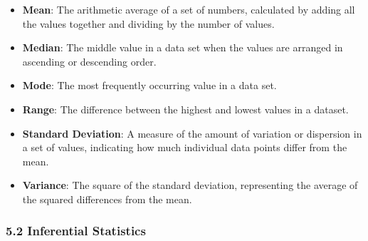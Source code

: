 \documentclass[
]{book}
\providecommand{\tightlist}{%
  \setlength{\itemsep}{0pt}\setlength{\parskip}{0pt}}
\begin{document}
\begin{itemize}
\tightlist
\item
  \textbf{Mean}: The arithmetic average of a set of numbers, calculated by adding all the values together and dividing by the number of values.
\item
  \textbf{Median}: The middle value in a data set when the values are arranged in ascending or descending order.
\item
  \textbf{Mode}: The most frequently occurring value in a data set.
\item
  \textbf{Range}: The difference between the highest and lowest values in a dataset.
\item
  \textbf{Standard Deviation}: A measure of the amount of variation or dispersion in a set of values, indicating how much individual data points differ from the mean.
\item
  \textbf{Variance}: The square of the standard deviation, representing the average of the squared differences from the mean.
\end{itemize}

\subsubsection*{\texorpdfstring{\textbf{5.2 Inferential Statistics}}{5.2 Inferential Statistics}}\label{inferential-statistics}
\end{document}
